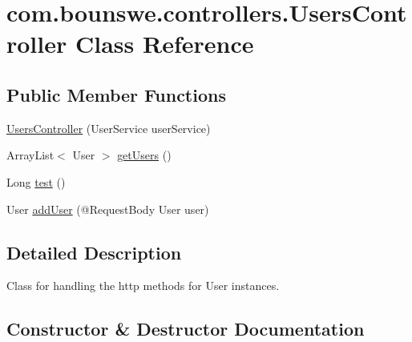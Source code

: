 \hypertarget{classcom_1_1bounswe_1_1controllers_1_1UsersController}{}\section{com.\+bounswe.\+controllers.\+Users\+Controller Class Reference}
\label{classcom_1_1bounswe_1_1controllers_1_1UsersController}
\subsection*{Public Member Functions}
\begin{DoxyCompactItemize}
\item 
\hyperlink{classcom_1_1bounswe_1_1controllers_1_1UsersController_a0a3434f97661f9d83af2c67521b9b392}{Users\+Controller} (User\+Service user\+Service)
\item 
Array\+List$<$ User $>$ \hyperlink{classcom_1_1bounswe_1_1controllers_1_1UsersController_ab45fc9120845ffb355d2f1cd901ec364}{get\+Users} ()
\item 
Long \hyperlink{classcom_1_1bounswe_1_1controllers_1_1UsersController_a355d0a44de6f7d90145c87f17da675b4}{test} ()
\item 
User \hyperlink{classcom_1_1bounswe_1_1controllers_1_1UsersController_aad6568d2679b1ca7b6608ecb53ed99fe}{add\+User} (@Request\+Body User user)
\end{DoxyCompactItemize}


\subsection{Detailed Description}
Class for handling the http methods for User instances. 

\subsection{Constructor \& Destructor Documentation}
\hypertarget{classcom_1_1bounswe_1_1controllers_1_1UsersController_a0a3434f97661f9d83af2c67521b9b392}{}
